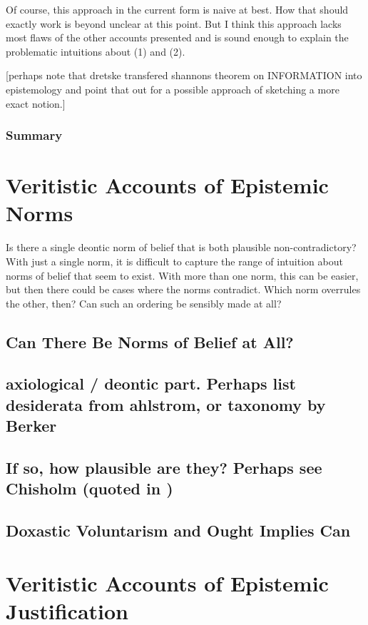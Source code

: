 \documentclass[12pt,numbers=noenddot]{scrartcl}
\begin{document}
Of course, this approach in the current form is naive at best. How that should exactly work is beyond unclear at this point. But I think this approach lacks most flaws of the other accounts presented and is sound enough to explain the problematic intuitions about (1) and (2).

[perhaps note that dretske transfered shannons theorem on INFORMATION into epistemology and point that out for a possible approach of sketching a more exact notion.]

\subsubsection{Summary}

\section{Veritistic Accounts of Epistemic Norms}

Is there a single deontic norm of belief that is both plausible non-contradictory? With just a single norm, it is difficult to capture the range of intuition about norms of belief that seem to exist. With more than one norm, this can be easier, but then there could be cases where the norms contradict. Which norm overrules the other, then? Can such an ordering be sensibly made at all?

\subsection{Can There Be Norms of Belief at All?}


\subsection{ axiological / deontic part. Perhaps list desiderata from ahlstrom, or taxonomy by Berker}
\subsection{ If so, how plausible are they? Perhaps see Chisholm (quoted in \textcite{Goldman2002-GOLTUO-2})}


\subsection{Doxastic Voluntarism and Ought Implies Can}

\section{Veritistic Accounts of Epistemic Justification}
\end{document}
